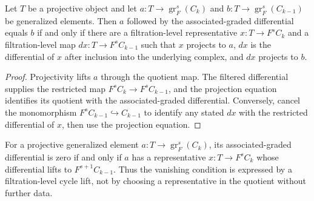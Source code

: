\begin{theorem}
  \label{thm:filtered-associated-graded-differential-representative}
  \leanok
  Let $T$ be a projective object and let
  $a:T\to\operatorname{gr}^s_F(C_k)$ and
  $b:T\to\operatorname{gr}^s_F(C_{k-1})$ be generalized elements.  Then
  $a$ followed by the associated-graded differential equals $b$ if and only
  if there are a filtration-level representative $x:T\to F^sC_k$ and a
  filtration-level map $dx:T\to F^sC_{k-1}$ such that $x$ projects to $a$,
  $dx$ is the differential of $x$ after inclusion into the underlying
  complex, and $dx$ projects to $b$.
\end{theorem}

\begin{proof}
  \leanok
  Projectivity lifts $a$ through the quotient map.  The filtered differential
  supplies the restricted map $F^sC_k\to F^sC_{k-1}$, and the projection
  equation identifies its quotient with the associated-graded differential.
  Conversely, cancel the monomorphism $F^sC_{k-1}\hookrightarrow C_{k-1}$
  to identify any stated $dx$ with the restricted differential of $x$, then
  use the projection equation.
\end{proof}

\begin{theorem}
  \label{thm:filtered-associated-graded-cycle-representative}
  \leanok
  For a projective generalized element $a:T\to\operatorname{gr}^s_F(C_k)$,
  its associated-graded differential is zero if and only if $a$ has a
  representative $x:T\to F^sC_k$ whose differential lifts to
  $F^{s+1}C_{k-1}$.  Thus the vanishing condition is expressed by a
  filtration-level cycle lift, not by choosing a representative in the
  quotient without further data.
\end{theorem}

